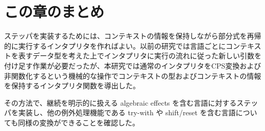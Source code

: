 \section{この章のまとめ}
\label{section:conclusion}

ステッパを実装するためには、コンテキストの情報を保持しながら部分式を再帰的に実行するインタプリタを作ればよい。以前の研究\cite{FCA19}では言語ごとにコンテキストを表すデータ型を考えた上でインタプリタに実行の流れに従った新しい引数を付け足す作業が必要だったが、本研究では通常のインタプリタをCPS変換および非関数化するという機械的な操作でコンテキストの型およびコンテキストの情報を保持するインタプリタ関数を導出した。

その方法で、継続を明示的に扱える algebraic effects を含む言語に対するステッパを実装し、他の例外処理機能である try-with や shift/reset を含む言語についても同様の変換ができることを確認した。
